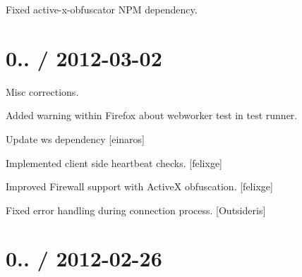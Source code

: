 \begin{DoxyItemize}
\item Fixed active-\/x-\/obfuscator N\+PM dependency.
\end{DoxyItemize}

\section*{0.. / 2012-\/03-\/02 }


\begin{DoxyItemize}
\item Misc corrections.
\item Added warning within Firefox about webworker test in test runner.
\item Update ws dependency \mbox{[}einaros\mbox{]}
\item Implemented client side heartbeat checks. \mbox{[}felixge\mbox{]}
\item Improved Firewall support with ActiveX obfuscation. \mbox{[}felixge\mbox{]}
\item Fixed error handling during connection process. \mbox{[}Outsideris\mbox{]}
\end{DoxyItemize}

\section*{0.. / 2012-\/02-\/26 }


